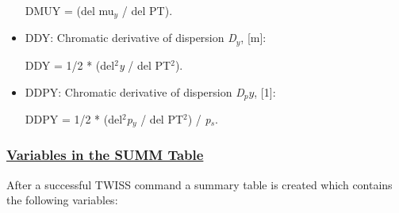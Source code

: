 \begin{itemize}
DMUY = (del mu$_\textit{y}$ / del PT).     


	\item DDY: Chromatic derivative of dispersion \textit{D$_y$}, [m]:     

DDY = 1/2 * (del$^2$\textit{y} / del PT$^2$).     


	\item DDPY: Chromatic derivative of dispersion \textit{D$_py$}, [1]:     

DDPY = 1/2 * (del$^2$\textit{p$_y$} / del PT$^2$) / \textit{p$_s$}.     


\end{itemize}

\subsubsection{\href{summ}{Variables in the SUMM Table}} After a successful TWISS command a summary table is created which contains the following variables: 

